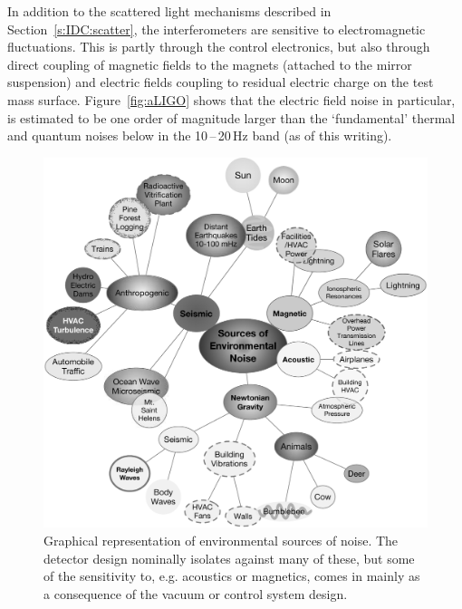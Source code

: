 In addition to the scattered light mechanisms described in
Section~\ref{s:IDC:scatter}, the interferometers are sensitive to
electromagnetic fluctuations. This is partly through the control
electronics, but also through direct coupling of magnetic fields to
the magnets (attached to the mirror suspension) and electric fields
coupling to residual electric charge on the test mass surface. Figure~\ref{fig:aLIGO} shows that the electric field noise in particular, is estimated to be one order of magnitude larger than the `fundamental' thermal and quantum noises below in the 10\,--\,20\,Hz band (as of this writing).


\begin{figure}[t]
\centering
\includegraphics[width=\columnwidth]{Figures/Environmental-BW.pdf}
\caption{Graphical representation of environmental sources of noise. The detector
design nominally isolates against many of these, but some of the sensitivity to,
e.g. acoustics or magnetics, comes in mainly as a consequence of the vacuum
or control system design.}
\label{fig:EnvironmentalNoise}
\end{figure}





